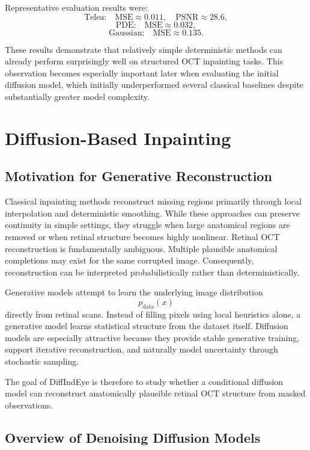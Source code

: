 \documentclass[12pt,oneside]{article}
\begin{document}
Representative evaluation results were:
\[
\text{Telea:}
\quad
\text{MSE} \approx 0.011,
\quad
\text{PSNR} \approx 28.6,
\]
\[
\text{PDE:}
\quad
\text{MSE} \approx 0.032,
\]
\[
\text{Gaussian:}
\quad
\text{MSE} \approx 0.135.
\]

These results demonstrate that relatively simple deterministic methods can already perform surprisingly well on structured OCT inpainting tasks. This observation becomes especially important later when evaluating the initial diffusion model, which initially underperformed several classical baselines despite substantially greater model complexity.

\section{Diffusion-Based Inpainting}

\subsection*{Motivation for Generative Reconstruction}

Classical inpainting methods reconstruct missing regions primarily through local interpolation and deterministic smoothing. While these approaches can preserve continuity in simple settings, they struggle when large anatomical regions are removed or when retinal structure becomes highly nonlinear.
Retinal OCT reconstruction is fundamentally ambiguous. Multiple plausible anatomical completions may exist for the same corrupted image. Consequently, reconstruction can be interpreted probabilistically rather than deterministically.

Generative models attempt to learn the underlying image distribution
\[
p_{\mathrm{data}}(x)
\]
directly from retinal scans. Instead of filling pixels using local heuristics alone, a generative model learns statistical structure from the dataset itself.
Diffusion models are especially attractive because they provide stable generative training, support iterative reconstruction, and naturally model uncertainty through stochastic sampling.


The goal of DiffIndEye is therefore to study whether a conditional diffusion model can reconstruct anatomically plausible retinal OCT structure from masked observations.

\subsection*{Overview of Denoising Diffusion Models}
\end{document}
